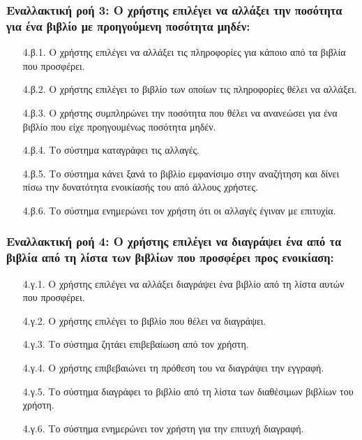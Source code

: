 \documentclass[12pt,a4paper]{article}
\begin{document}
\subsubsection*{Εναλλακτική ροή 3: Ο χρήστης επιλέγει να αλλάξει την ποσότητα για ένα βιβλίο με προηγούμενη ποσότητα μηδέν:}
\begin{enumerate}
    \item [4.β.1.] Ο χρήστης επιλέγει να αλλάξει τις πληροφορίες για κάποιο από τα βιβλία που προσφέρει.
    \item [4.β.2.] Ο χρήστης επιλέγει το βιβλίο των οποίων τις πληροφορίες θέλει να αλλάξει.

    \item [4.β.3.] Ο χρήστης συμπληρώνει την ποσότητα που θέλει να ανανεώσει για ένα βιβλίο που είχε προηγουμένως ποσότητα μηδέν. 

    \item [4.β.4.] Το σύστημα καταγράφει τις αλλαγές.
    \item [4.β.5.] Το σύστημα κάνει ξανά το βιβλίο εμφανίσιμο στην αναζήτηση και δίνει πίσω την δυνατότητα ενοικίασής του από άλλους χρήστες.
    \item [4.β.6.] Το σύστημα ενημερώνει τον χρήστη ότι οι αλλαγές έγιναν με επιτυχία.
\end{enumerate}

\subsubsection*{Εναλλακτική ροή 4: Ο χρήστης επιλέγει να διαγράψει ένα από τα βιβλία από τη λίστα των βιβλίων που προσφέρει προς ενοικίαση:}
\begin{enumerate}
    \item [4.γ.1.] Ο χρήστης επιλέγει να αλλάξει διαγράψει ένα βιβλίο από τη λίστα αυτών που προσφέρει.
    \item [4.γ.2.] Ο χρήστης επιλέγει το βιβλίο που θέλει να διαγράψει.
    \item [4.γ.3.] Το σύστημα ζητάει επιβεβαίωση από τον χρήστη.
    \item [4.γ.4.] Ο χρήστης επιβεβαιώνει τη πρόθεση του να διαγράψει την εγγραφή.
    \item [4.γ.5.] Το σύστημα διαγράφει το βιβλίο από τη λίστα των διαθέσιμων βιβλίων του χρήστη.
    \item [4.γ.6.] Το σύστημα ενημερώνει τον χρήστη για την επιτυχή διαγραφή.
\end{enumerate}
\end{document}
